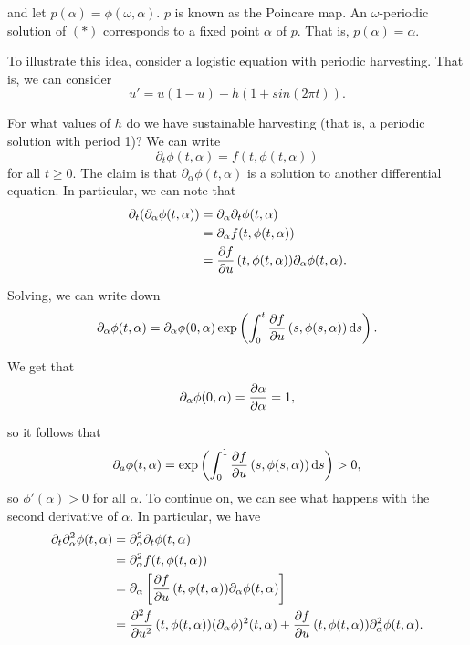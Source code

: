 \documentclass{article}
\begin{document}
    and let $p(\alpha) = \phi(\omega, \alpha)$. $p$ is known as the Poincare map. An $\omega$-periodic solution of $(*)$ corresponds to a fixed point $\alpha$ of $p$. That is, $p(\alpha) = \alpha$.
    \newpar

    To illustrate this idea, consider a logistic equation with periodic harvesting. That is, we can consider
    \[
        u' = u(1 - u) - h(1 + sin(2\pi t)).
    \]

    For what values of $h$ do we have sustainable harvesting (that is, a periodic solution with period 1)? We can write 
    \[
        \partial_t \phi(t, \alpha) = f(t, \phi(t, \alpha))
    \]
    for all $t \geq 0$. The claim is that $\partial_\alpha\phi(t, \alpha)$ is a solution to another differential equation. In particular, we can note that 
    \begin{align*}
        \partial_t (\partial_\alpha \phi(t, \alpha)) &= \partial_\alpha \partial_t \phi(t, \alpha) \\
        &= \partial_\alpha f(t, \phi(t, \alpha)) \\
        &= \pdv{f}{u}\, {(t, \phi(t, \alpha))} \partial_\alpha \phi(t, \alpha).
    \end{align*}

    Solving, we can write down
    \[
        \partial_\alpha \phi(t, \alpha) = \partial_\alpha \phi(0, \alpha) \exp \left(\int_0^t \pdv{f}{u} \, (s, \phi(s, \alpha)) \, \text{d}s \right).
    \]

    We get that 
    \[
        \partial_\alpha \phi(0, \alpha) = \pdv{\alpha}{\alpha} = 1,
    \]

    so it follows that 
    \[
        \partial_a \phi(t, \alpha) = \exp \left( \int_0^1 \pdv{f}{u} \, (s, \phi(s, \alpha)) \, \text{d}s\right) > 0,
    \]
    so $\phi'(\alpha) > 0$ for all $\alpha$. To continue on, we can see what happens with the second derivative of $\alpha$. In particular, we have 
    \begin{align*}
        \partial_t \partial_\alpha^2 \phi(t, \alpha) &= \partial^2_\alpha \partial_t \phi(t, \alpha) \\
        &= \partial_\alpha^2 f(t, \phi(t, \alpha)) \\
        &= \partial_\alpha \left[\pdv{f}{u} \, (t, \phi(t, \alpha)) \partial_\alpha \phi(t, \alpha)\right] \\
        &= \pdv[2]{f}{u} \, (t, \phi(t, \alpha)) (\partial_\alpha \phi)^2 (t, \alpha) + \pdv{f}{u} \, (t, \phi(t, \alpha)) \partial^2_\alpha \phi(t, \alpha).
    \end{align*}
\end{document}
